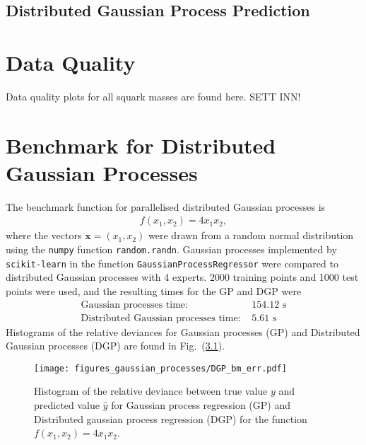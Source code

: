 \documentclass[twoside,english]{uiofysmaster}
\begin{document}
{\begin{appendices}


\section{Distributed Gaussian Process Prediction}\label{App:Distributed Gaussian Process Prediction}




 
\chapter{Data Quality}\label{App: Quality Plots}

Data quality plots for all squark masses are found here. SETT INN!

\chapter{Benchmark for Distributed Gaussian Processes}

The benchmark function for parallelised distributed Gaussian processes is
\begin{align*}
f(x_1, x_2) =  4x_1x_2,
\end{align*}
where the vectors $\textbf{x} = (x_1, x_2)$ were drawn from a random normal distribution using the \verb|numpy| function \verb|random.randn|. Gaussian processes implemented by \verb|scikit-learn| in the function \verb|GaussianProcessRegressor| were compared to distributed Gaussian processes with 4 experts. 2000 training points and 1000 test points were used, and the resulting times for the GP and DGP were
\begin{align}
\text{Gaussian processes time: }& 154.12 \text{ s}\\
\text{Distributed Gaussian processes time: }& 5.61 \text{ s}
\end{align}
Histograms of the relative deviances for Gaussian processes (GP) and Distributed Gaussian processes (DGP) are found in Fig.\ (\ref{Fig:: gaussian process : DGP BM error histogram}).

\begin{figure}
\centering
\texttt{[image: figures\_gaussian\_processes/DGP\_bm\_err.pdf]}
\caption{Histogram of the relative deviance between true value $y$ and predicted value $\hat{y}$ for Gaussian process regression (GP) and Distributed gaussian process regression (DGP) for the function $f(x_1,x_2) = 4x_1 x_2$.}
\label{Fig:: gaussian process : DGP BM error histogram}
\end{figure}


\end{appendices}}
\end{document}
